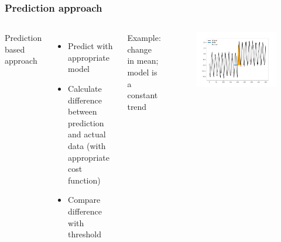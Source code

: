 \documentclass[intlimits, 9pt, unicode]{beamer}
\begin{document}
\begin{frame}
    \frametitle{Prediction approach}
  \begin{columns}[T,onlytextwidth]
	Prediction based approach
	    \begin{itemize}
	    	\item Predict with appropriate model
		\item Calculate difference between prediction and actual data (with appropriate cost function)
		\item Compare difference with threshold
	    \end{itemize}
      Example: change in mean; model is a constant trend
      \begin{figure}
	\includegraphics[scale=0.2]{images/approaches_first_4}
	\end{figure}
     \end{columns}
\end{frame}
\end{document}
